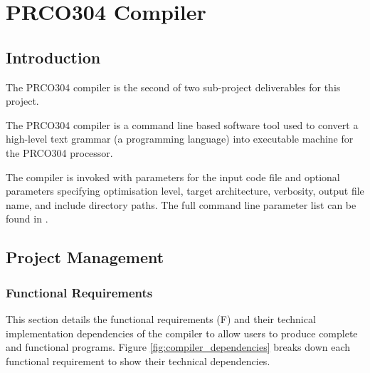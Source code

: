 \documentclass[11pt,a4paper]{report}
\newcommand{\scname}{PRCO304}
\begin{document}
\chapter{\scname{} Compiler}
{\hypersetup{linkcolor=black}
\startcontents[chapters]
}

\section{Introduction}
The \scname{} compiler is the second of two sub-project deliverables for this project.

The \scname{} compiler is a command line based software tool used to convert a high-level text grammar (a programming language) into executable machine for the \scname{} processor.

The compiler is invoked with parameters for the input code file and optional parameters specifying optimisation level, target architecture, verbosity, output file name, and include directory paths. The full command line parameter list can be found in {}.

\section{Project Management}
\subsection{Functional Requirements}
This section details the functional requirements (F) and their technical implementation dependencies of the compiler to allow users to produce complete and functional programs. Figure \ref{fig:compiler_dependencies} breaks down each functional requirement to show their technical dependencies.
\end{document}
